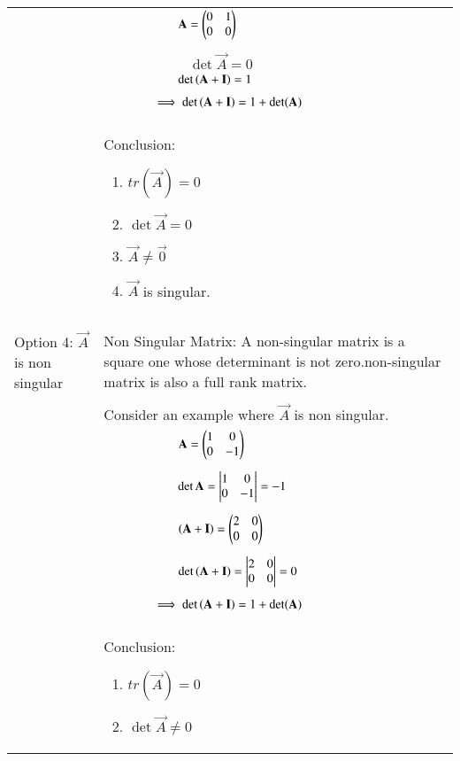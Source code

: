 \documentclass[journal,12pt]{IEEEtran}
\begin{document}
\begin{longtable}{|p{5cm}|p{13cm}|}
    & $\qquad\qquad\qquad\mathbf{A}= \begin{pmatrix}0&1\\0&0\end{pmatrix}$\\
    &\\
    & $\qquad\qquad\qquad\det{\vec{A}}=0$\\
    & $\qquad\qquad\qquad\det\left(\mathbf{A}+\mathbf{I}\right)=1$\\
    &\\
    & $\qquad\qquad\implies\det\left(\mathbf{A}+\mathbf{I}\right)=1+\det(\mathbf{A}) $\\
    &\\
     & Conclusion: {\begin{enumerate}
	\item $tr(\vec{A})=0$
	\item $\det{\vec{A}}=0$
	\item $\vec{A}\neq\vec{0}$
	\item $\vec{A}$ is singular.\end{enumerate}}\\
	&\\
    \hline
	\multirow{3}{*}{Option 4: $\vec{A}$ is non singular}&\\
  	& Non Singular Matrix:
A non-singular matrix is a square one whose determinant is not zero.non-singular matrix is also  a full rank matrix.\\
&\\
	& Consider an example where $\vec{A}$ is non singular.\\
	& $\qquad\qquad\qquad\mathbf{A}=\begin{pmatrix}1&0\\0&-1\end{pmatrix}$\\
	&\\
	& $\qquad\qquad\qquad\det{\mathbf{A}} = \begin{vmatrix}1&0\\0&-1\end{vmatrix} = -1$\\
	&\\
	& $\qquad\qquad\qquad\left(\mathbf{A}+\mathbf{I}\right)=\begin{pmatrix}2&0\\0&0\end{pmatrix}$\\
	&\\
	& $\qquad\qquad\qquad\det\left(\mathbf{A}+\mathbf{I}\right)=\begin{vmatrix}2&0\\0&0\end{vmatrix}=0$\\
	&\\
	& $\qquad\qquad\implies\det\left(\mathbf{A}+\mathbf{I}\right)=1+\det(\mathbf{A})$\\
	&\\
	& Conclusion: {\begin{enumerate}
	\item $tr(\vec{A})=0$
	\item $\det{\vec{A}}\neq0$

\end{enumerate}}
\end{longtable}
\end{document}
